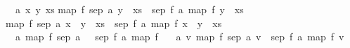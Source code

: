 \begin{isabellebody}
\begin{isamarkuptxt}
  \begin{isabelle}%
\ {}{}\ {}a\ x\ y\ xs{}\isanewline
{}map\ f\ {}sep\ a\ {}y\ {}\ xs{}{}\ {}\ sep\ {}f\ a{}\ {}map\ f\ {}y\ {}\ xs{}{}\ {}\isanewline
{}map\ f\ {}sep\ a\ {}x\ {}\ y\ {}\ xs{}{}\ {}\ sep\ {}f\ a{}\ {}map\ f\ {}x\ {}\ y\ {}\ xs{}{}\isanewline
\ {}{}\ {}a{}\ map\ f\ {}sep\ a\ {}{}{}\ {}\ sep\ {}f\ a{}\ {}map\ f\ {}{}{}\isanewline
\ {}{}\ {}a\ v{}\ map\ f\ {}sep\ a\ {}v{}{}\ {}\ sep\ {}f\ a{}\ {}map\ f\ {}v{}{}%

\end{isabelle}
\end{isamarkuptxt}
\end{isabellebody}
